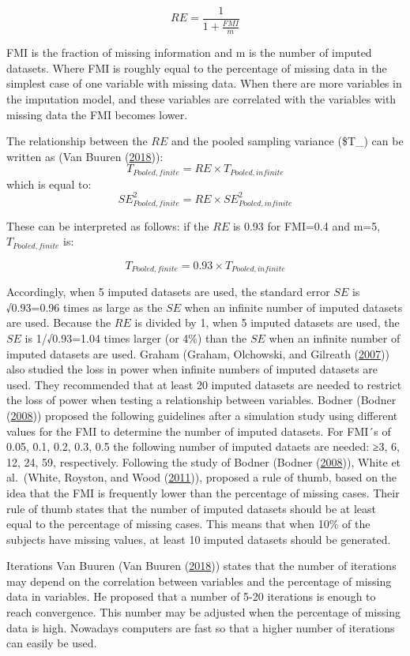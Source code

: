 \documentclass[
]{book}
\begin{document}
\[RE=  \frac{1}{1+ \frac{FMI}{m}}\]

FMI is the fraction of missing information and m is the number of
imputed datasets. Where FMI is roughly equal to the percentage of
missing data in the simplest case of one variable with missing data.
When there are more variables in the imputation model, and these
variables are correlated with the variables with missing data the FMI
becomes lower.

The relationship between the \(RE\) and the pooled sampling variance
(\$T\_) can be written as (Van Buuren
(\protect\hyperlink{ref-VanBuuren2018}{2018})):
\[T_{Pooled,finite}=RE×T_{Pooled,infinite}\] which is equal to:
\[SE_{Pooled,finite}^2=RE×SE_{Pooled,infinite}^2 \]

These can be interpreted as follows: if the \(RE\) is 0.93 for FMI=0.4
and m=5, \(T_{Pooled,finite}\) is:

\[T_{Pooled,finite}=0.93×T_{Pooled,infinite}\]

Accordingly, when 5 imputed datasets are used, the standard error \(SE\)
is √0.93=0.96 times as large as the \(SE\) when an infinite number of
imputed datasets are used. Because the \(RE\) is divided by 1, when 5
imputed datasets are used, the \(SE\) is 1/√0.93=1.04 times larger (or
4\%) than the \(SE\) when an infinite number of imputed datasets are
used. Graham (Graham, Olchowski, and Gilreath
(\protect\hyperlink{ref-Graham2007}{2007})) also studied the loss in
power when infinite numbers of imputed datasets are used. They
recommended that at least 20 imputed datasets are needed to restrict the
loss of power when testing a relationship between variables. Bodner
(Bodner (\protect\hyperlink{ref-Bodner2008}{2008})) proposed the
following guidelines after a simulation study using different values for
the FMI to determine the number of imputed datasets. For FMI´s of 0.05,
0.1, 0.2, 0.3, 0.5 the following number of imputed dataets are needed:
≥3, 6, 12, 24, 59, respectively. Following the study of Bodner (Bodner
(\protect\hyperlink{ref-Bodner2008}{2008})), White et al.~(White,
Royston, and Wood (\protect\hyperlink{ref-White2011}{2011})), proposed a
rule of thumb, based on the idea that the FMI is frequently lower than
the percentage of missing cases. Their rule of thumb states that the
number of imputed datasets should be at least equal to the percentage of
missing cases. This means that when 10\% of the subjects have missing
values, at least 10 imputed datasets should be generated.

Iterations Van Buuren (Van Buuren
(\protect\hyperlink{ref-VanBuuren2018}{2018})) states that the number of
iterations may depend on the correlation between variables and the
percentage of missing data in variables. He proposed that a number of
5-20 iterations is enough to reach convergence. This number may be
adjusted when the percentage of missing data is high. Nowadays computers
are fast so that a higher number of iterations can easily be used.
\end{document}
